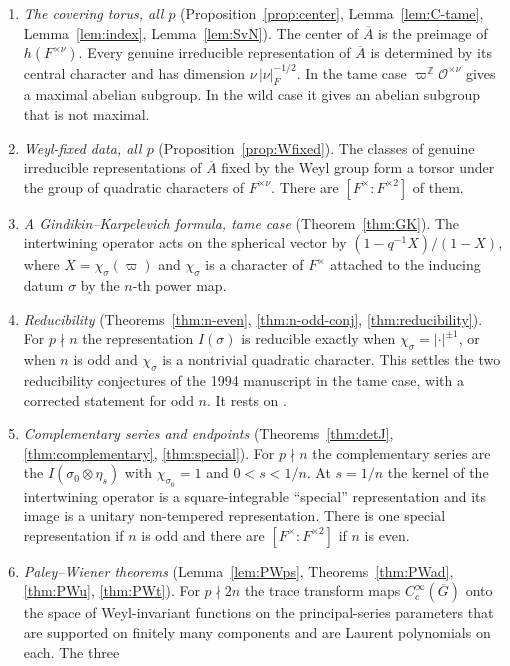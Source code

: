 \documentclass[12pt,letterpaper]{article}
\numberwithin{equation}{section}
\theoremstyle{definition}
\newcommand{\Z}{\mathbb Z}
\newcommand{\OF}{\mathcal O}
\newcommand{\vp}{\varpi}
\newcommand{\bG}{\overline{G}}
\newcommand{\bA}{\overline{A}}
\begin{document}
\begin{enumerate}[label=(\arabic*),leftmargin=*,itemsep=2pt]
\item \emph{The covering torus, all $p$} (Proposition~\ref{prop:center},
Lemma~\ref{lem:C-tame}, Lemma~\ref{lem:index}, Lemma~\ref{lem:SvN}).  The center of $\bA$
is the preimage of $h(F^{\times\nu})$.  Every genuine irreducible representation of $\bA$
is determined by its central character and has dimension $\nu\,|\nu|_F^{-1/2}$.  In the
tame case $\vp^{\Z}\OF^{\times\nu}$ gives a maximal abelian subgroup.  In the wild case it
gives an abelian subgroup that is not maximal.
\item \emph{Weyl-fixed data, all $p$} (Proposition~\ref{prop:Wfixed}).  The classes of
genuine irreducible representations of $\bA$ fixed by the Weyl group form a torsor under
the group of quadratic characters of $F^{\times\nu}$.  There are $[F^\times:F^{\times2}]$ of
them.
\item \emph{A Gindikin--Karpelevich formula, tame case} (Theorem~\ref{thm:GK}).  The
intertwining operator acts on the spherical vector by
$(1-q^{-1}X)/(1-X)$, where $X=\chi_\sigma(\vp)$ and $\chi_\sigma$ is a character of
$F^\times$ attached to the inducing datum $\sigma$ by the $n$-th power map.
\item \emph{Reducibility} (Theorems~\ref{thm:n-even}, \ref{thm:n-odd-conj},
\ref{thm:reducibility}).  For $p\nmid n$ the representation $I(\sigma)$ is reducible exactly
when $\chi_\sigma=|\cdot|^{\pm1}$, or when $n$ is odd and $\chi_\sigma$ is a nontrivial
quadratic character.  This settles the two reducibility conjectures of the 1994 manuscript
in the tame case, with a corrected statement for odd $n$.  It rests on \cite{GS16,He25}.
\item \emph{Complementary series and endpoints} (Theorems~\ref{thm:detJ},
\ref{thm:complementary}, \ref{thm:special}).  For $p\nmid n$ the complementary series are
the $I(\sigma_0\otimes\eta_s)$ with $\chi_{\sigma_0}=1$ and $0<s<1/n$.  At $s=1/n$ the
kernel of the intertwining operator is a square-integrable ``special'' representation
and its image is a unitary non-tempered representation.  There is one special
representation if $n$ is odd and there are $[F^\times:F^{\times2}]$ if $n$ is even.
\item \emph{Paley--Wiener theorems} (Lemma~\ref{lem:PWps}, Theorems~\ref{thm:PWad},
\ref{thm:PWu}, \ref{thm:PWt}).  For $p\nmid 2n$ the trace transform maps $C_c^\infty(\bG)$
onto the space of Weyl-invariant functions on the principal-series parameters that are
supported on finitely many components and are Laurent polynomials on each.  The three

\end{enumerate}
\end{document}
